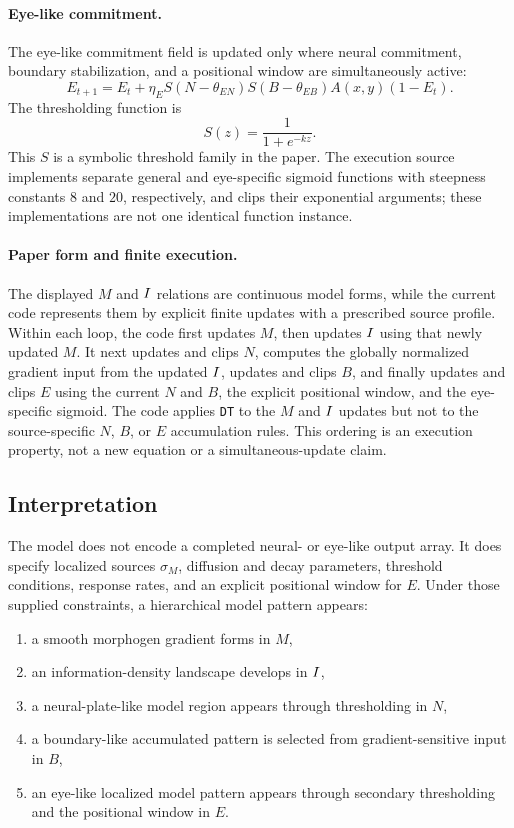 \paragraph{Eye-like commitment.}
The eye-like commitment field is updated only where neural commitment, boundary stabilization, and a positional window are simultaneously active:
\begin{equation}
  E_{t+1}
  =
  E_t
  + \eta_E S(N - \theta_{EN}) S(B - \theta_{EB}) A(x,y)(1 - E_t).
\end{equation}
The thresholding function is
\begin{equation}
  S(z) = \frac{1}{1 + e^{-kz}}.
\end{equation}
This \(S\) is a symbolic threshold family in the paper. The execution source implements separate general and eye-specific sigmoid functions with steepness constants \(8\) and \(20\), respectively, and clips their exponential arguments; these implementations are not one identical function instance.

\paragraph{Paper form and finite execution.}
The displayed \(M\) and \(I\) relations are continuous model forms, while the current code represents them by explicit finite updates with a prescribed source profile. Within each loop, the code first updates \(M\), then updates \(I\) using that newly updated \(M\). It next updates and clips \(N\), computes the globally normalized gradient input from the updated \(I\), updates and clips \(B\), and finally updates and clips \(E\) using the current \(N\) and \(B\), the explicit positional window, and the eye-specific sigmoid. The code applies \texttt{DT} to the \(M\) and \(I\) updates but not to the source-specific \(N\), \(B\), or \(E\) accumulation rules. This ordering is an execution property, not a new equation or a simultaneous-update claim.

\subsection{Interpretation}

The model does not encode a completed neural- or eye-like output array. It does specify localized sources \(\sigma_M\), diffusion and decay parameters, threshold conditions, response rates, and an explicit positional window for \(E\). Under those supplied constraints, a hierarchical model pattern appears:
\begin{enumerate}
  \item a smooth morphogen gradient forms in \(M\),
  \item an information-density landscape develops in \(I\),
  \item a neural-plate-like model region appears through thresholding in \(N\),
  \item a boundary-like accumulated pattern is selected from gradient-sensitive input in \(B\),
  \item an eye-like localized model pattern appears through secondary thresholding and the positional window in \(E\).
\end{enumerate}

